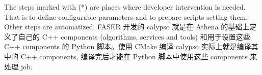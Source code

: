 The steps marked with (*) are places where developer intervention is needed. That is to define configurable parameters and to prepare scripts setting them. Other steps are automatized. FASER 开发的 calypso 就是在 Athena 的基础上定义了自己的 C++ components (algorithms, services and tools) 和用于设置这些 C++ components 的 Python 脚本。使用 CMake 编译 calypso 实际上就是编译其中的 C++ components, 编译完后才能在 Python 脚本中使用这些 components 来处理 job.





